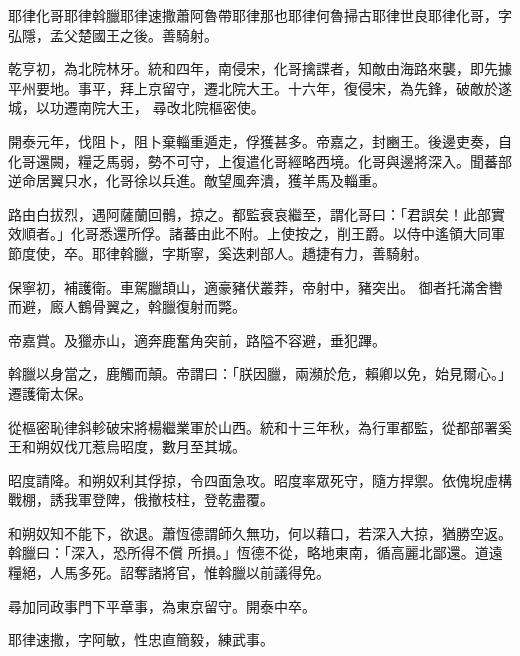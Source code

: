 
\begin{pinyinscope}

 耶律化哥耶律斡臘耶律速撒蕭阿魯帶耶律那也耶律何魯掃古耶律世良耶律化哥，字弘隱，孟父楚國王之後。善騎射。



 乾亨初，為北院林牙。統和四年，南侵宋，化哥擒諜者，知敵由海路來襲，即先據平州要地。事平，拜上京留守，遷北院大王。十六年，復侵宋，為先鋒，破敵於遂城，以功遷南院大王，
 尋改北院樞密使。



 開泰元年，伐阻卜，阻卜棄輜重遁走，俘獲甚多。帝嘉之，封豳王。後邊吏奏，自化哥還闕，糧乏馬弱，勢不可守，上復遣化哥經略西境。化哥與邊將深入。聞蕃部逆命居翼只水，化哥徐以兵進。敵望風奔潰，獲羊馬及輜重。



 路由白拔烈，遇阿薩蘭回鶻，掠之。都監衰哀繼至，謂化哥曰：「君誤矣！此部實效順者。」化哥悉還所俘。諸蕃由此不附。上使按之，削王爵。以侍中遙領大同軍節度使，卒。耶律斡臘，字斯寧，奚迭剌部人。趫捷有力，善騎射。



 保寧初，補護衛。車駕臘頡山，適豪豬伏叢莽，帝射中，豬突出。
 御者托滿舍轡而避，廄人鶴骨翼之，斡臘復射而斃。



 帝嘉賞。及獵赤山，適奔鹿奮角突前，路隘不容避，垂犯蹕。



 斡臘以身當之，鹿觸而顛。帝謂曰：「朕因臘，兩瀕於危，賴卿以免，始見爾心。」遷護衛太保。



 從樞密恥律斜軫破宋將楊繼業軍於山西。統和十三年秋，為行軍都監，從都部署奚王和朔奴伐兀惹烏昭度，數月至其城。



 昭度請降。和朔奴利其俘掠，令四面急攻。昭度率眾死守，隨方捍禦。依傀堄虛構戰棚，誘我軍登陴，俄撤枝柱，登乾盡覆。



 和朔奴知不能下，欲退。蕭恆德謂師久無功，何以藉口，若深入大掠，猶勝空返。斡臘曰：「深入，恐所得不償
 所損。」恆德不從，略地東南，循高麗北鄙還。道遠糧絕，人馬多死。詔奪諸將官，惟斡臘以前議得免。



 尋加同政事門下平章事，為東京留守。開泰中卒。



 耶律速撒，字阿敏，性忠直簡毅，練武事。




\end{pinyinscope}
